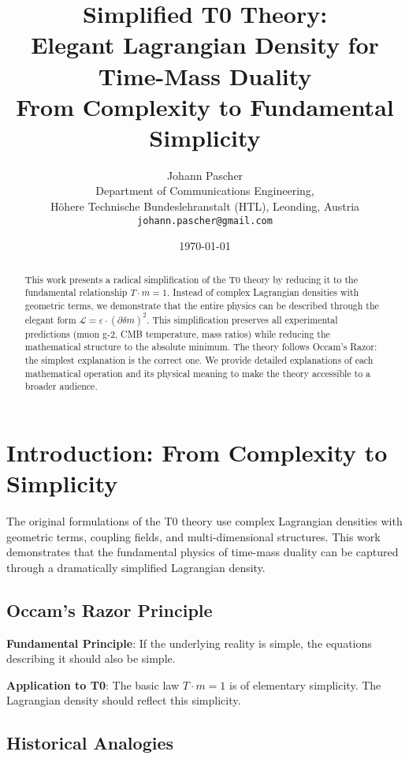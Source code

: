 \documentclass[12pt,a4paper]{article}
\title{Simplified T0 Theory: \\
	Elegant Lagrangian Density for Time-Mass Duality \\
	\large From Complexity to Fundamental Simplicity}
\author{Johann Pascher\\
	Department of Communications Engineering, \\Höhere Technische Bundeslehranstalt (HTL), Leonding, Austria\\
	\texttt{johann.pascher@gmail.com}}
\date{\today}
\newcommand{\deltam}{\delta m}
\newcommand{\Lag}{\mathcal{L}}
\theoremstyle{definition}
\theoremstyle{remark}
\begin{document}
	
	\maketitle
	
	\begin{abstract}
		This work presents a radical simplification of the T0 theory by reducing it to the fundamental relationship $T \cdot m = 1$. Instead of complex Lagrangian densities with geometric terms, we demonstrate that the entire physics can be described through the elegant form $\Lag = \varepsilon \cdot (\partial \deltam)^2$. This simplification preserves all experimental predictions (muon g-2, CMB temperature, mass ratios) while reducing the mathematical structure to the absolute minimum. The theory follows Occam's Razor: the simplest explanation is the correct one. We provide detailed explanations of each mathematical operation and its physical meaning to make the theory accessible to a broader audience.
	\end{abstract}
	
	\tableofcontents
	\newpage
	
	\section{Introduction: From Complexity to Simplicity}
	
	The original formulations of the T0 theory use complex Lagrangian densities with geometric terms, coupling fields, and multi-dimensional structures. This work demonstrates that the fundamental physics of time-mass duality can be captured through a dramatically simplified Lagrangian density.
	
	\subsection{Occam's Razor Principle}
	
	\begin{tcolorbox}[colback=blue!5!white,colframe=blue!75!black,title=Occam's Razor in Physics]
		\textbf{Fundamental Principle}: If the underlying reality is simple, the equations describing it should also be simple.
		
		\textbf{Application to T0}: The basic law $T \cdot m = 1$ is of elementary simplicity. The Lagrangian density should reflect this simplicity.
	\end{tcolorbox}
	
	\subsection{Historical Analogies}
	
\end{document}
